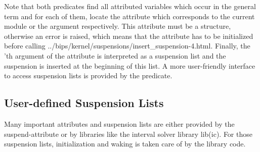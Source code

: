 Note that both predicates
find all attributed variables which occur in the general term  and
for
each of them,
locate the attribute which corresponds to the current module or the
 argument respectively.
This attribute must be a structure, otherwise an error
is raised, which means that the attribute has to be initialized
before calling
%
{../bips/kernel/suspensions/insert_suspension-4.html}.%
Finally, the 'th argument of the attribute
is interpreted as a suspension list and the suspension
 is inserted at the beginning of this list.
A more user-friendly interface to access suspension lists is
provided by the
predicate.


\subsection{User-defined Suspension Lists}

Many important attributes and suspension lists are either provided by
the suspend-attribute or by libraries like the interval solver library lib(ic).
For those suspension lists, initialization and waking is taken care of
by the library code.

